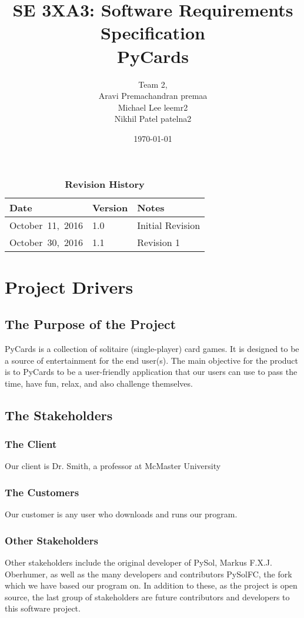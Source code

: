 \documentclass[12pt, titlepage]{article}
\title{SE 3XA3: Software Requirements Specification\\PyCards}
\author{Team 2,
		\\ Aravi Premachandran  premaa
		\\ Michael Lee  leemr2
		\\ Nikhil Patel  patelna2
}
\date{\today}
\begin{document}
	\maketitle
	\tableofcontents
	\listoftables
	\listoffigures
	\begin{table}[bp]
		\caption{\bf Revision History}
		\begin{tabularx}{\textwidth}{p{3cm}p{2cm}X}
			\toprule {\bf Date} & {\bf Version} & {\bf Notes}\\
			\midrule
			\mbox{October 11, 2016} & 1.0 & Initial Revision\\
			\mbox{October 30, 2016} & 1.1 & Revision 1\\
			\bottomrule
		\end{tabularx}
	\end{table}
	\newpage
	\section{Project Drivers}
		\subsection{The Purpose of the Project}
		\indent \indent PyCards is a collection of solitaire 
		(single-player) card games. It is designed to be a source of 
		entertainment for the end 
		user(s). The main objective for the product is to PyCards to be a 
		user-friendly application that our users can use to pass the time, have 
		fun, relax, and also challenge themselves.
		\subsection{The Stakeholders}
		\subsubsection{The Client}
		\indent \indent Our client is Dr. Smith, a professor at McMaster 
		University
		\subsubsection{The Customers}
		Our customer is any user who downloads and runs our program.
		\subsubsection{Other Stakeholders}
		Other stakeholders include the original developer of PySol, Markus 
		F.X.J. Oberhumer, as well as the many developers and contributors 
		PySolFC, the fork which we have based our program on.  In addition to 
		these, as the project is open source, the last group of stakeholders 
		are future contributors and developers to this software project.
\end{document}
